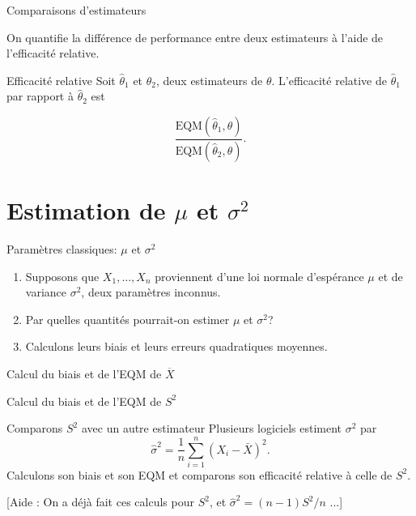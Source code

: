 \documentclass{BeamerTemplate}
\begin{document}
\begin{frame}[t]{Comparaisons d'estimateurs}

   On quantifie la différence de performance entre deux estimateurs à l'aide
   de \alert{l'efficacité relative}.
    \begin{Boite}{Efficacité relative}
        Soit $\hat{\theta}_1$ et $\hat{\theta}_2$, deux estimateurs de $\theta$. L'efficacité relative de $\hat{\theta}_1$ par rapport à $\hat{\theta}_2$ est 

        $$\frac{\text{EQM}(\hat{\theta}_1, \theta)}{\text{EQM}(\hat{\theta}_2, \theta)}.$$
    \end{Boite}
\end{frame}



\section{Estimation de $\mu$ et $\sigma^2$}

\begin{frame}[t]{Paramètres classiques: $\mu$ et $\sigma^2$}

\begin{enumerate}[$\bullet$]\itemsep 1cm
\item<1-> Supposons que $X_1,\hdots,X_n$ proviennent d'une loi normale d'espérance $\mu$ et de variance $\sigma^2$, deux paramètres inconnus.
\item<2-> Par quelles quantités pourrait-on estimer $\mu$ et $\sigma^2$?

\item<3-> Calculons leurs biais et leurs erreurs quadratiques moyennes.
\end{enumerate}
\end{frame}

\begin{frame}[t]{Calcul du biais et de l'EQM de $\overline{X}$}
    
\end{frame}

\begin{frame}[t]{Calcul du biais et de l'EQM de $S^2$}
    
\end{frame}


\begin{frame}[t]{Comparons $S^2$ avec un autre estimateur}
 Plusieurs logiciels estiment $\sigma^2$ par
 $$\widehat{\sigma}^2=\frac{1}{n}\sum_{i=1}^n(X_i-\bar{X})^2.$$
 Calculons son biais et son EQM et comparons son efficacité relative à celle de $S^2$.

 [Aide : On a déjà fait ces calculs pour $S^2$, et $\widehat{\sigma}^2=(n-1)S^2/n$ ...]
\end{frame}
\end{document}
